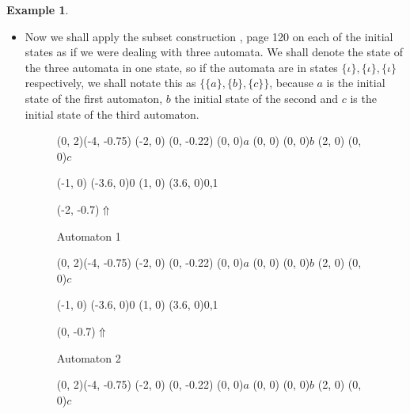 \documentclass{article}
\theoremstyle{definition}
\newtheorem{example}[theorem]{Example}
\begin{document}
\begin{example}
\begin{itemize}
\begin{figure}[H]
\begin{graph}
  \freetext(-2, -0.7){$\Uparrow$}
  \freetext(0, -0.7){$\Uparrow$}
  \freetext(2, -0.7){$\Uparrow$}
\end{graph}
\caption{A non-deterministic automaton in reverse reading}
\label{fig:nondet_reverse}
\end{figure}

\item Now we shall apply the subset construction \cite{Wood}, page 120
      on each of the initial states as if we were dealing with three automata. 
      We shall denote the state of the three automata in one state, so if
      the automata are in states $\{\iota\}, \{\iota\}, \{\iota\}$ 
      respectively, we shall notate this as $\{\{a\}, \{b\}, \{c\}\}$, because
      $a$ is the initial state of the first automaton, $b$ the initial state
      of the second and $c$ is the initial state of the third automaton.

\begin{figure}[H]
\begin{graph}(0, 2)(-4, -0.75)
  (-2, 0) 
    (0, -0.22){} (0, 0){$a$}
  (0, 0) (0, 0){$b$}
  (2, 0) (0, 0){$c$}

  (-1, 0) \freetext(-3.6, 0){0}
   
   
  (1, 0) \freetext(3.6, 0){0,1}

  \freetext(-2, -0.7){$\Uparrow$}
\end{graph}
\caption{Automaton 1}
\label{fig:nondet_reverse1}
\end{figure}
\begin{figure}[H]
\begin{graph}(0, 2)(-4, -0.75)
  (-2, 0) 
    (0, -0.22){} (0, 0){$a$}
  (0, 0) (0, 0){$b$}
  (2, 0) (0, 0){$c$}

  (-1, 0) \freetext(-3.6, 0){0}
   
   
  (1, 0) \freetext(3.6, 0){0,1}

  \freetext(0, -0.7){$\Uparrow$}
\end{graph}
\caption{Automaton 2}
\label{fig:nondet_reverse2}
\end{figure}
\begin{figure}[H]
\begin{graph}(0, 2)(-4, -0.75)
  (-2, 0) 
    (0, -0.22){} (0, 0){$a$}
  (0, 0) (0, 0){$b$}
  (2, 0) (0, 0){$c$}


\end{graph}
\end{figure}
\end{itemize}
\end{example}
\end{document}
